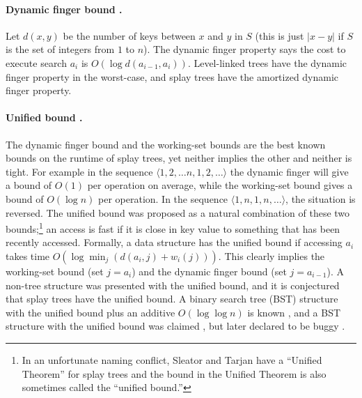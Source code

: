 \documentclass{llncs}
\newcommand{\BigOh}[1]{O\!\left(#1\right)}
\begin{document}
\paragraph{Dynamic finger bound \cite{DBLP:journals/siamcomp/ColeMSS00,DBLP:journals/siamcomp/Cole00}.} Let $d(x,y)$ be the number of keys between $x$ and $y$ in $S$ (this is just $|x-y|$ if $S$ is the set of integers from $1$ to $n$). The dynamic finger property says the cost to execute search $a_i$ is $\BigOh{\log d(a_{i-1},a_i)}$. Level-linked trees \cite{DBLP:journals/iandc/HoffmanMRT86} have the dynamic finger property in the worst-case, and splay trees have the amortized dynamic finger property.

\paragraph{Unified bound \cite{DBLP:journals/tcs/BadoiuCDI07}.} The dynamic finger bound and the working-set bounds are the best known bounds on the runtime of splay trees, yet neither implies the other and neither is tight. For example in the sequence $\langle 1,2,\ldots n, 1,2, \ldots \rangle$ the dynamic finger will give a bound of $\BigOh{1}$ per operation on average, while the working-set bound gives a bound of $\BigOh{\log n}$ per operation. In the sequence $\langle 1,n,1,n,\ldots \rangle$, the situation is reversed.  The unified bound was proposed as a natural combination of these two bounds;\footnote{In an unfortunate naming conflict, Sleator and Tarjan have a ``Unified Theorem'' for splay trees \cite[Theorem~5]{DBLP:journals/jacm/SleatorT85} and the bound in the Unified Theorem is also sometimes called the ``unified bound.''} 
an access is fast if it is close in key value to something that has been recently accessed. Formally, a data structure has the unified bound if accessing $a_i$ takes time $\BigOh{\log \min_j ( d(a_i,j)+w_i(j))}$. This clearly implies the working-set bound (set $j=a_i$) and the dynamic finger bound (set $j=a_{i-1}$). A non-tree structure was presented with the unified bound, and it is conjectured that splay trees have the unified bound. A binary search tree (BST) structure with the unified bound plus an additive $\BigOh{\log \log n}$ is known \cite{DBLP:conf/wads/DerryberryS09}, and a BST structure with the unified bound was claimed \cite{dthesis}, but later declared to be buggy \cite{wrong}.
\end{document}
